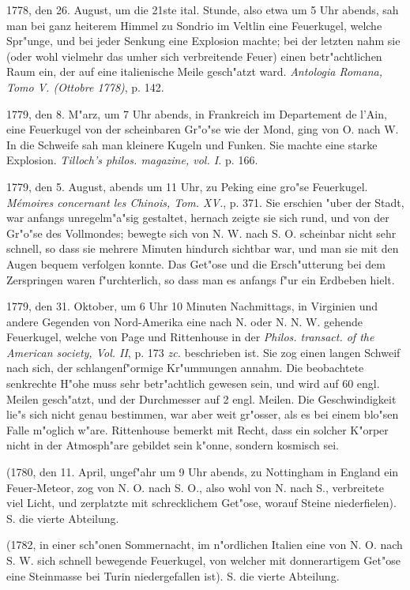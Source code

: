 \documentclass[a4paper, 11pt, oneside, polutonikogreek, german]{article}
\begin{document}
1778, den 26. August, um die 21ste ital. Stunde, also etwa um 5 Uhr abends, sah man bei ganz heiterem Himmel zu Sondrio im Veltlin eine Feuerkugel, welche Spr"unge, und bei jeder Senkung eine Explosion machte; bei der letzten nahm sie (oder wohl vielmehr das umher sich verbreitende Feuer) einen betr"achtlichen Raum ein, der auf eine italienische Meile gesch"atzt ward. \emph{Antologia Romana, Tomo V. (Ottobre 1778)}, p. 142.

1779, den 8. M"arz, um 7 Uhr abends, in Frankreich im Departement de l'Ain, eine Feuerkugel von der scheinbaren Gr"o"se wie der Mond, ging von O. nach W. In die Schweife sah man kleinere Kugeln und Funken. Sie machte eine starke Explosion. \emph{Tilloch's philos. magazine, vol. I.} p. 166.

1779, den 5. August, abends um 11 Uhr, zu Peking eine gro"se Feuerkugel. \emph{Mémoires concernant les Chinois, Tom. XV.}, p. 371. Sie erschien "uber der Stadt, war anfangs unregelm"a"sig gestaltet, hernach zeigte sie sich rund, und von der Gr"o"se des Vollmondes; bewegte sich von N. W. nach S. O. scheinbar nicht sehr schnell, so dass sie mehrere Minuten hindurch sichtbar war, und man sie mit den Augen bequem verfolgen konnte. Das Get"ose und die Ersch"utterung bei dem Zerspringen waren f"urchterlich, so dass man es anfangs f"ur ein Erdbeben hielt.

1779, den 31. Oktober, um 6 Uhr 10 Minuten Nachmittags, in Virginien und andere Gegenden von Nord-Amerika eine nach N. oder N. N. W. gehende Feuerkugel, welche von Page und Rittenhouse in der \emph{Philos. transact. of the American society, Vol. II}, p. 173 \emph{zc.} beschrieben ist. Sie zog einen langen Schweif nach sich, der schlangenf"ormige Kr"ummungen annahm. Die beobachtete senkrechte H"ohe muss sehr betr"achtlich gewesen sein, und wird auf 60 engl. Meilen gesch"atzt, und der Durchmesser auf 2 engl. Meilen. Die Geschwindigkeit lie"s sich nicht genau bestimmen, war aber weit gr"osser, als es bei einem blo"sen Falle m"oglich w"are. Rittenhouse bemerkt mit Recht, dass ein solcher K"orper nicht in der Atmosph"are gebildet sein k"onne, sondern kosmisch sei.

(1780, den 11. April, ungef"ahr um 9 Uhr abends, zu Nottingham in England ein Feuer-Meteor, zog von N. O. nach S. O., also wohl von N. nach S., verbreitete viel Licht, und zerplatzte mit schrecklichem Get"ose, worauf Steine niederfielen). S. die vierte Abteilung.

(1782, in einer sch"onen Sommernacht, im n"ordlichen Italien eine von N. O. nach S. W. sich schnell bewegende Feuerkugel, von welcher mit donnerartigem Get"ose eine Steinmasse bei Turin niedergefallen ist). S. die vierte Abteilung.
\end{document}

